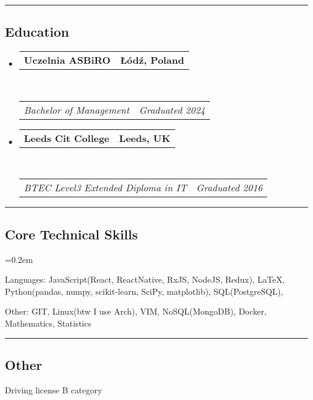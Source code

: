 \documentclass[10pt,letterpaper]{article}
\makeatletter
\newenvironment{indentsection}[1]%
{\begin{list}{}%
	{\setlength{\leftmargin}{#1}}%
	\item[]%
}
{\end{list}}
\newcommand{\headerrow}[2]
{\begin{tabular*}{\linewidth}{l@{\extracolsep{\fill}}r}
	#1 &
	#2 \\
\end{tabular*}}
\makeatother
\begin{document}
\hrule
\vspace{-0.4em}
\subsection*{Education}

\begin{itemize}
	\parskip=0.2em
	\item
	      \headerrow
	      {\textbf{Uczelnia ASBiRO}}
	      {\textbf{Łódź, Poland}}
	      \\
	      \headerrow
	      {\emph{Bachelor of Management}}
	      {\emph{Graduated 2024}}
	\item
	      \headerrow
	      {\textbf{Leeds Cit College}}
	      {\textbf{Leeds, UK}}
	      \\
	      \headerrow
	      {\emph{BTEC Level3 Extended Diploma in IT}}
	      {\emph{Graduated 2016}}
\end{itemize}


\hrule
\subsection*{Core Technical Skills}

\begin{indentsection}{\parindent}
	\begin{description*}
		\parskip=0.2em
		\item[Languages:]
		      JavaScript(React, ReactNative, RxJS, NodeJS, Redux), \LaTeX, Python(pandas, numpy, scikit-learn, SciPy, matplotlib), SQL(PostgreSQL),
		\item[Other:] GIT, Linux(btw I use Arch), VIM, NoSQL(MongoDB), Docker, Mathematics, Statistics
	\end{description*}
\end{indentsection}

\hrule
\vspace{-0.4em}
\subsection*{Other}
\begin{indentsection}{\parindent}
	\hyphenpenalty=1000
	\begin{description*}
		\item Driving license B category
	\end{description*}
\end{indentsection}
\end{document}
